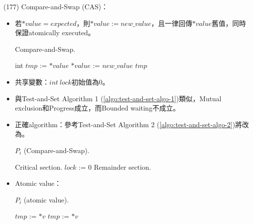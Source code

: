 \begin{theorem}{(177)} Compare-and-Swap (CAS)：\begin{itemize}
        \item 若$* value = expected$，則$*value := new\_value$，且一律回傳$*value$舊值，同時保證atomically executed。
        \begin{algorithm}[H]
            \caption{Compare-and-Swap.}
            \begin{algorithmic}[1]
                    \State int $tmp$ := $*value$
                        \State $*value$ := $new\_value$
                    \EndIf
                    \State \Return $tmp$
                \EndFunction
            \end{algorithmic}
        \end{algorithm}
        \item 共享變數：$int \ lock$初始值為$0$。
        \item 與Test-and-Set Algorithm 1 (\ref{algo:test-and-set-algo-1})類似，Mutual exclusion和Progress成立，而Bounded waiting不成立。
        \item 正確algorithm\label{algo:comp-and-swap}：參考Test-and-Set Algorithm 2 (\ref{algo:test-and-set-algo-2})將改為。
        \begin{algorithm}[H]
            \caption{$P_i$ (Compare-and-Swap).}
            \begin{algorithmic}[1]
                    \Repeat
                        \EndWhile
                        \State Critical section.
                        \State $lock$ := $0$
                        \State Remainder section.
                \EndFunction
            \end{algorithmic}
        \end{algorithm}
        \item Atomic value：
        \begin{algorithm}[H]
            \caption{$P_i$ (atomic value).}
            \begin{algorithmic}[1]
                    \State $tmp$ := $*v$
                        \State $tmp$ := $*v$
                    \EndWhile
                \EndFunction
            \end{algorithmic}
        \end{algorithm}
    \end{itemize}
\end{theorem}

